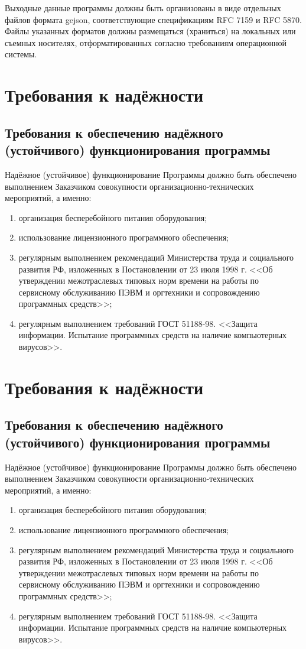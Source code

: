 Выходные данные программы должны быть организованы в виде отдельных файлов формата gejson, соответствующие спецификациям 
RFC 7159 и RFC 5870. Файлы указанных форматов должны размещаться (храниться) на локальных или съемных носителях, 
отформатированных согласно требованиям операционной системы.

\section{Требования к надёжности}
\subsection{Требования к обеспечению надёжного (устойчивого) функционирования программы}
Надёжное (устойчивое) функционирование Программы должно быть обеспечено выполнением Заказчиком совокупности 
организационно-технических мероприятий, а именно:
\begin{enumerate}
    \item организация бесперебойного питания оборудования;
    \item использование лицензионного программного обеспечения;
    \item регулярным выполнением рекомендаций Министерства труда и социального развития РФ, изложенных в 
        Постановлении от 23 июля 1998 г. <<Об утверждении межотраслевых типовых норм времени на работы по
        сервисному обслуживанию ПЭВМ и оргтехники и сопровождению программных средств>>;
    \item регулярным выполнением требований ГОСТ 51188-98. <<Защита информации. Испытание программных средств 
        на наличие компьютерных вирусов>>.
\end{enumerate}

\section{Требования к надёжности}
\subsection{Требования к обеспечению надёжного (устойчивого) функционирования программы}
Надёжное (устойчивое) функционирование Программы должно быть обеспечено выполнением Заказчиком совокупности 
организационно-технических мероприятий, а именно:
\begin{enumerate}
    \item организация бесперебойного питания оборудования;
    \item использование лицензионного программного обеспечения;
    \item регулярным выполнением рекомендаций Министерства труда и социального развития РФ, изложенных в 
        Постановлении от 23 июля 1998 г. <<Об утверждении межотраслевых типовых норм времени на работы по
        сервисному обслуживанию ПЭВМ и оргтехники и сопровождению программных средств>>;
    \item регулярным выполнением требований ГОСТ 51188-98. <<Защита информации. Испытание программных средств 
        на наличие компьютерных вирусов>>.
\end{enumerate}

